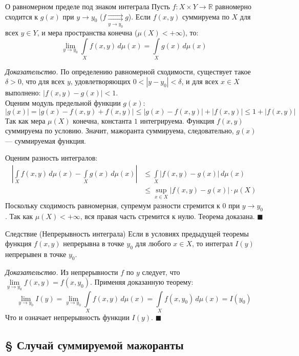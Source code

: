 \documentclass[12pt,a4paper]{article}
\newenvironment{Proof}[1][Доказательство]{\vspace{0.5em}\noindent\textit{#1.}\hspace{0.5em}\ignorespaces}{\hfill$\blacksquare$\vspace{1em}}
\begin{document}
\begin{Theorem}{О равномерном пределе под знаком интеграла}{}
Пусть $f: X \times Y \to \mathbb{R}$ равномерно сходится к $g(x)$ при $y \to y_0$ ($f \underset{y\to y_0}{\rightrightarrows} g$). Если $f(x, y)$ суммируема по $X$ для всех $y \in Y$, и мера пространства конечна ($\mu(X) < +\infty$), то:
$$ \lim\limits_{y \to y_0} \int\limits_X f(x,y) \, d\mu(x) = \int\limits_X g(x) \, d\mu(x) $$
\end{Theorem}

\begin{Proof}
По определению равномерной сходимости, существует такое $\delta > 0$, что для всех $y$, удовлетворяющих $0 < |y - y_0| < \delta$, и для всех $x \in X$ выполнено: $|f(x,y) - g(x)| < 1$. \\
Оценим модуль предельной функции $g(x)$:
$$ |g(x)| = |g(x) - f(x,y) + f(x,y)| \le |g(x) - f(x,y)| + |f(x,y)| \le 1 + |f(x,y)| $$
Так как мера $\mu(X)$ конечна, константа $1$ интегрируема. Функция $f(x,y)$ суммируема по условию. Значит, мажоранта суммируема, следовательно, $g(x)$ — суммируемая функция.

Оценим разность интегралов:
\begin{align*}
    \left| \int\limits_X f(x,y) \, d\mu(x) - \int\limits_X g(x) \, d\mu(x) \right| &\le \int\limits_X |f(x,y) - g(x)| \, d\mu(x) \\
    &\le \sup\limits_{x \in X} |f(x,y) - g(x)| \cdot \mu(X)
\end{align*}
Поскольку сходимость равномерная, супремум разности стремится к $0$ при $y \to y_0$. Так как $\mu(X) < +\infty$, вся правая часть стремится к нулю. Теорема доказана.
\end{Proof}

\begin{Theorem}{Следствие (Непрерывность интеграла)}{}
Если в условиях предыдущей теоремы функция $f(x, y)$ непрерывна в точке $y_0$ для любого $x \in X$, то интеграл $I(y)$ непрерывен в точке $y_0$.
\end{Theorem}

\begin{Proof}
Из непрерывности $f$ по $y$ следует, что $\lim\limits_{y \to y_0} f(x, y) = f(x, y_0)$. Применяя доказанную теорему:
$$ \lim\limits_{y \to y_0} I(y) = \lim\limits_{y \to y_0} \int\limits_X f(x,y) \, d\mu(x) = \int\limits_X f(x, y_0) \, d\mu(x) = I(y_0) $$
Что и означает непрерывность функции $I(y)$.
\end{Proof}

\subsection{§ Случай суммируемой мажоранты}
\end{document}
